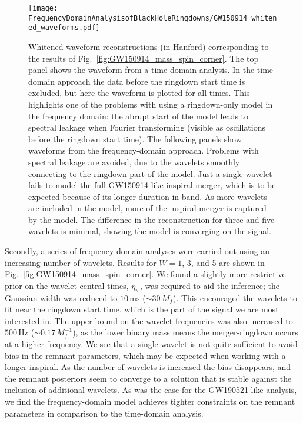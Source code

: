 \begin{figure*}[t]
	\centering
	\texttt{[image: FrequencyDomainAnalysisofBlackHoleRingdowns/GW150914\_whitened\_waveforms.pdf]}
	\caption[Whitened waveform reconstructions (in Hanford) corresponding to the results of Fig.~\ref{fig:GW150914_mass_spin_corner}]{ 
		Whitened waveform reconstructions (in Hanford) corresponding to the results of Fig.~\ref{fig:GW150914_mass_spin_corner}. 
		The top panel shows the waveform from a time-domain analysis. 
		In the time-domain approach the data before the ringdown start time is excluded, but here the waveform is plotted for all times.
		This highlights one of the problems with using a ringdown-only model in the frequency domain: the abrupt start of the model leads to spectral leakage when Fourier transforming (visible as oscillations before the ringdown start time).
		The following panels show waveforms from the frequency-domain approach.
		Problems with spectral leakage are avoided, due to the wavelets smoothly connecting to the ringdown part of the model.
		Just a single wavelet fails to model the full GW150914-like inspiral-merger, which is to be expected because of its longer duration in-band.
		As more wavelets are included in the model, more of the inspiral-merger is captured by the model.
		The difference in the reconstruction for three and five wavelets is minimal, showing the model is converging on the signal.
	}
	\label{fig:GW150914_whitened_waveforms}
\end{figure*}

Secondly, a series of frequency-domain analyses were carried out using an increasing number of wavelets.
Results for $W=1$, 3, and 5 are shown in Fig.~\ref{fig:GW150914_mass_spin_corner}.
We found a slightly more restrictive prior on the wavelet central times, $\eta_w$, was required to aid the inference; the Gaussian width was reduced to $10\,\mathrm{ms}$ ($\sim 30\,M_f$).
This encouraged the wavelets to fit near the ringdown start time, which is the part of the signal we are most interested in.
The upper bound on the wavelet frequencies was also increased to $500\,\mathrm{Hz}$ ($\sim 0.17\,M_f^{-1}$), as the lower binary mass means the merger-ringdown occurs at a higher frequency.
We see that a single wavelet is not quite sufficient to avoid bias in the remnant parameters, which may be expected when working with a longer inspiral.
As the number of wavelets is increased the bias disappears, and the remnant posteriors seem to converge to a solution that is stable against the inclusion of additional wavelets. 
As was the case for the GW190521-like analysis, we find the frequency-domain model achieves tighter constraints on the remnant parameters in comparison to the time-domain analysis. 

